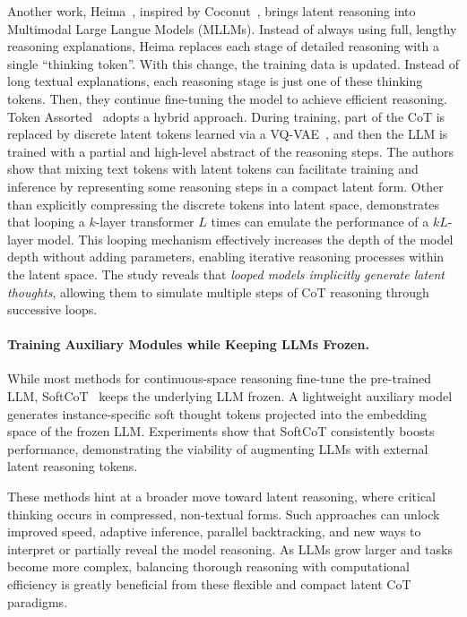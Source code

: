 Another work, Heima~\cite{shen2025efficient}, inspired by Coconut~\cite{hao2024training}, brings latent reasoning into Multimodal Large Langue Models (MLLMs). Instead of always using full, lengthy reasoning explanations, Heima replaces each stage of detailed reasoning with a single ``thinking token''. With this change, the training data is updated. Instead of long textual explanations, each reasoning stage is just one of these thinking tokens. Then, they continue fine-tuning the model to achieve efficient reasoning.
%
Token Assorted~\cite{su2025token} adopts a hybrid approach. During training, part of the CoT is replaced by discrete latent tokens learned via a VQ-VAE~\cite{van2017neural}, and then the LLM is trained with a partial and high-level abstract of the reasoning steps. The authors show that mixing text tokens with latent tokens can facilitate training and inference by representing some reasoning steps in a compact latent form. 
%
Other than explicitly compressing the discrete tokens into latent space, \cite{saunshi2025reasoning} demonstrates that looping a $k$-layer transformer $L$ times can emulate the performance of a $kL$-layer model. This looping mechanism effectively increases the depth of the model depth without adding parameters, enabling iterative reasoning processes within the latent space. The study reveals that \textit{looped models implicitly generate latent thoughts}, allowing them to simulate multiple steps of CoT reasoning through successive loops.

\paragraph{Training Auxiliary Modules while Keeping LLMs Frozen.} 
%
While most methods for continuous-space reasoning fine-tune the pre-trained LLM, SoftCoT~\cite{xu2025softcot} keeps the underlying LLM frozen. A lightweight auxiliary model generates instance-specific soft thought tokens projected into the embedding space of the frozen LLM. Experiments show that SoftCoT consistently boosts performance, demonstrating the viability of augmenting LLMs with external latent reasoning tokens.

These methods hint at a broader move toward latent reasoning, where critical thinking occurs in compressed, non-textual forms. Such approaches can unlock improved speed, adaptive inference, parallel backtracking, and new ways to interpret or partially reveal the model reasoning. As LLMs grow larger and tasks become more complex, balancing thorough reasoning with computational efficiency is greatly beneficial from these flexible and compact latent CoT paradigms.